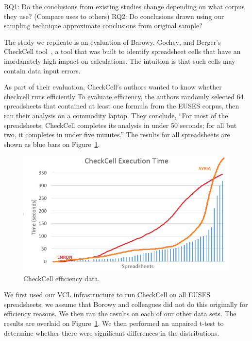 \documentclass[conference]{IEEEtran}
\begin{document}
RQ1: Do the conclusions from existing studies change depending on what corpus they use? (Compare uses to others)
RQ2: Do conclusions drawn using our sampling technique approximate conclusions from original sample?

The study we replicate is an evaluation of Barowy, Gochev, and Berger's
CheckCell tool~\cite{barowy14}, a tool that was built to identify spreadsheet
cells that have an inordanately high impact on calculations.
The intuition is that such cells may contain data input errors.

As part of their evaluation, CheckCell's authors wanted to know whether checkcell runs efficiently
To evaluate efficiency, the authors randomly selected 64 spreadsheets that contained at least one
formula from the EUSES corpus, then ran their analysis on a commodity laptop.
They conclude, ``For most of the spreadsheets, CheckCell completes its analysis in under 50 seconds;
for all but two, it completes in under five minutes.''
The results for all spreadsheets are shown as blue bars on Figure~\ref{fig:effectiveness}.


\begin{figure}[!t]
\centering
\includegraphics[width=\columnwidth]{checkcell.png}
\caption{CheckCell efficiency data.}
\label{fig:effectiveness}
\end{figure}

We first used our VCL infrastructure to run CheckCell on all EUSES spreadsheets; we assume
that Borowy and colleagues did not do this originally for efficiency reasons.
We then ran the results on each of our other data sets.
The results are overlaid on Figure~\ref{fig:effectiveness}.
We then performed an unpaired t-test to determine whether there were significant differences
in the distributions.
\end{document}
